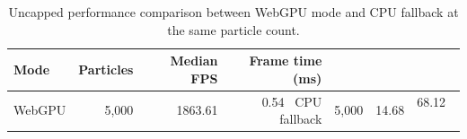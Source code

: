 \begin{table}[t]
\centering
\caption{Uncapped performance comparison between WebGPU mode and CPU fallback at the same particle count.}
\label{tab:cpu_gpu_uncapped_comparison}
\begin{tabular}{lrrr}
\hline
Mode & Particles & Median FPS & Frame time (ms) \\
\hline
WebGPU & 5,000 & 1863.61 & 0.54 \
CPU fallback & 5,000 & 14.68 & 68.12 \
\hline
\end{tabular}
\end{table}